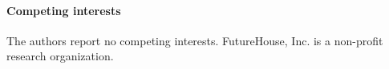\documentclass{article}
\begin{document}
\begin{bibunit}[unsrt]
\paragraph{Competing interests} The authors report no competing interests. FutureHouse, Inc. is a non-profit research organization. 

\putbib[references] %

\end{bibunit}


\end{document}
